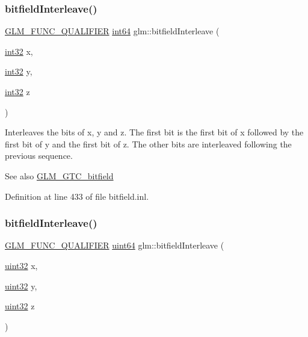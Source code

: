 \subsubsection{\texorpdfstring{bitfieldInterleave()}{bitfieldInterleave()}\hspace{0.1cm}{\footnotesize\ttfamily [11/16]}}
{\footnotesize\ttfamily \mbox{\hyperlink{setup_8hpp_a33fdea6f91c5f834105f7415e2a64407}{G\+L\+M\+\_\+\+F\+U\+N\+C\+\_\+\+Q\+U\+A\+L\+I\+F\+I\+ER}} \mbox{\hyperlink{group__gtc__type__precision_ga435d75819cce297cc5fa21bd84ef89a5}{int64}} glm\+::bitfield\+Interleave (\begin{DoxyParamCaption}\item[{\mbox{\hyperlink{group__gtc__type__precision_ga632d8b25f6b61659f39ea4321fab92a4}{int32}}}]{x,  }\item[{\mbox{\hyperlink{group__gtc__type__precision_ga632d8b25f6b61659f39ea4321fab92a4}{int32}}}]{y,  }\item[{\mbox{\hyperlink{group__gtc__type__precision_ga632d8b25f6b61659f39ea4321fab92a4}{int32}}}]{z }\end{DoxyParamCaption})}

Interleaves the bits of x, y and z. The first bit is the first bit of x followed by the first bit of y and the first bit of z. The other bits are interleaved following the previous sequence.

\begin{DoxySeeAlso}{See also}
\mbox{\hyperlink{group__gtc__bitfield}{G\+L\+M\+\_\+\+G\+T\+C\+\_\+bitfield}} 
\end{DoxySeeAlso}


Definition at line 433 of file bitfield.\+inl.

\mbox{\label{group__gtc__bitfield_ga7c10eb37f608365cfaef5ca2c476e1ce}} 
\subsubsection{\texorpdfstring{bitfieldInterleave()}{bitfieldInterleave()}\hspace{0.1cm}{\footnotesize\ttfamily [12/16]}}
{\footnotesize\ttfamily \mbox{\hyperlink{setup_8hpp_a33fdea6f91c5f834105f7415e2a64407}{G\+L\+M\+\_\+\+F\+U\+N\+C\+\_\+\+Q\+U\+A\+L\+I\+F\+I\+ER}} \mbox{\hyperlink{group__gtc__type__precision_gae3632bf9b37da66233d78930dd06378a}{uint64}} glm\+::bitfield\+Interleave (\begin{DoxyParamCaption}\item[{\mbox{\hyperlink{group__gtc__type__precision_ga202b6a53c105fcb7e531f9b443518451}{uint32}}}]{x,  }\item[{\mbox{\hyperlink{group__gtc__type__precision_ga202b6a53c105fcb7e531f9b443518451}{uint32}}}]{y,  }\item[{\mbox{\hyperlink{group__gtc__type__precision_ga202b6a53c105fcb7e531f9b443518451}{uint32}}}]{z }\end{DoxyParamCaption})}

